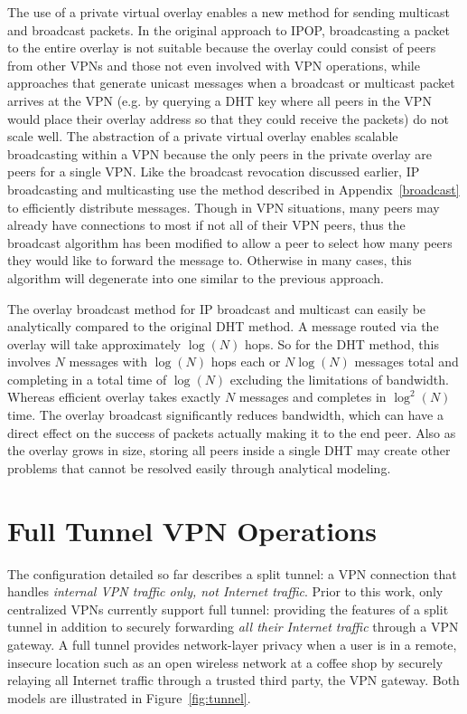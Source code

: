 The use of a private virtual overlay enables a new method for sending multicast
and broadcast packets. In the original approach to IPOP, broadcasting a packet
to the entire overlay  is not suitable because the overlay could consist of
peers from other VPNs and those not even involved with VPN operations, while
approaches that generate unicast messages when a broadcast or multicast packet
arrives at the VPN (e.g. by querying a DHT key where all peers in the VPN would
place their overlay address so that they could receive the packets) do not
scale well. The abstraction of a private virtual overlay enables scalable
broadcasting within a VPN because the only peers in the private overlay are
peers for a single VPN.  Like the broadcast revocation discussed earlier, IP
broadcasting and multicasting use the method described in
Appendix~\ref{broadcast} to efficiently distribute messages.  Though in VPN
situations, many peers may already have connections to most if not all of their
VPN peers, thus the broadcast algorithm has been modified to allow a peer to
select how many peers they would like to forward the message to.  Otherwise in
many cases, this algorithm will degenerate into one similar to the previous
approach.  

The overlay broadcast method for IP broadcast and multicast can easily be
analytically compared to the original DHT method.  A message routed via the
overlay will take approximately $\log(N)$ hops.  So for the DHT method, this
involves $N$ messages with $\log(N)$ hops each or $N\log(N)$ messages total and
completing in a total time of $\log(N)$ excluding the limitations of bandwidth.
Whereas efficient overlay takes exactly $N$ messages and completes in
$\log^2(N)$ time.  The overlay broadcast significantly reduces bandwidth, which
can have a direct effect on the success of packets actually making it to the
end peer.  Also as the overlay grows in size, storing all peers inside a single
DHT may create other problems that cannot be resolved easily through analytical
modeling.

\section{Full Tunnel VPN Operations}
\label{full_tunnel}

The configuration detailed so far describes a split tunnel: a VPN connection
that handles \emph{internal VPN traffic only, not Internet traffic}.  Prior to
this work, only centralized VPNs currently support full tunnel: providing the
features of a split tunnel in addition to securely forwarding \emph{all their
Internet traffic} through a VPN gateway.  A full tunnel provides network-layer
privacy when a user is in a remote, insecure location such as an open wireless
network at a coffee shop by securely relaying all Internet traffic through a
trusted third party, the VPN gateway.  Both models are illustrated in
Figure~\ref{fig:tunnel}.

